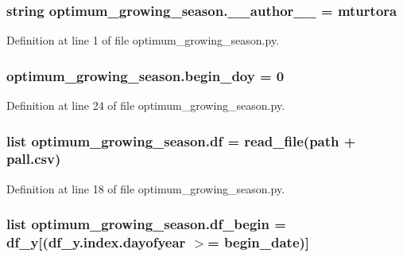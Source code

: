 \subsubsection[{\+\_\+\+\_\+author\+\_\+\+\_\+}]{\setlength{\rightskip}{0pt plus 5cm}string optimum\+\_\+growing\+\_\+season.\+\_\+\+\_\+author\+\_\+\+\_\+ = \textquotesingle{}mturtora\textquotesingle{}}\label{namespaceoptimum__growing__season_ae41ec55f6e12d36d800ecea02431a361}


Definition at line 1 of file optimum\+\_\+growing\+\_\+season.\+py.

\hypertarget{namespaceoptimum__growing__season_a7db52c7f8bf69d14f4351de1d63a6c88}{}
\subsubsection[{begin\+\_\+doy}]{\setlength{\rightskip}{0pt plus 5cm}optimum\+\_\+growing\+\_\+season.\+begin\+\_\+doy = 0}\label{namespaceoptimum__growing__season_a7db52c7f8bf69d14f4351de1d63a6c88}


Definition at line 24 of file optimum\+\_\+growing\+\_\+season.\+py.

\hypertarget{namespaceoptimum__growing__season_a14764e801d085f0fee6374df984ca31a}{}
\subsubsection[{df}]{\setlength{\rightskip}{0pt plus 5cm}list optimum\+\_\+growing\+\_\+season.\+df = {\bf read\+\_\+file}({\bf path} + \textquotesingle{}pall.\+csv\textquotesingle{})}\label{namespaceoptimum__growing__season_a14764e801d085f0fee6374df984ca31a}


Definition at line 18 of file optimum\+\_\+growing\+\_\+season.\+py.

\hypertarget{namespaceoptimum__growing__season_ac483918c3a7aebac572b6cd2f40f8177}{}
\subsubsection[{df\+\_\+begin}]{\setlength{\rightskip}{0pt plus 5cm}list optimum\+\_\+growing\+\_\+season.\+df\+\_\+begin = {\bf df\+\_\+y}\mbox{[}(df\+\_\+y.\+index.\+dayofyear $>$= begin\+\_\+date)\mbox{]}}\label{namespaceoptimum__growing__season_ac483918c3a7aebac572b6cd2f40f8177}


